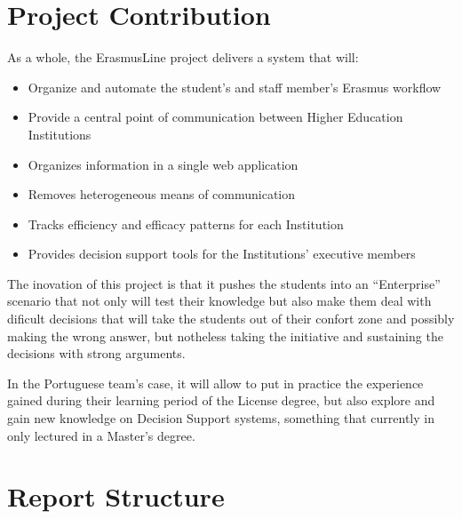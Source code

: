 \newpage

\section{Project Contribution}

As a whole, the ErasmusLine project delivers a system that will:

\begin{itemize}
  \item Organize and automate the student's and staff member's Erasmus workflow
  \item Provide a central point of communication between Higher Education
  Institutions
  \item Organizes information in a single web application
  \item Removes heterogeneous means of communication
  \item Tracks efficiency and efficacy patterns for each Institution
  \item Provides decision support tools for the Institutions' executive members
\end{itemize}

The inovation of this project is that it pushes the students into an
``Enterprise'' scenario that not only will test their knowledge but also make
them deal with dificult decisions that will take the students out of their
confort zone and possibly making the wrong answer, but notheless taking the
initiative and sustaining the decisions with strong arguments.


In the Portuguese team's case, it will allow to put in practice the experience
gained during their learning period of the License degree, but also explore
and gain new knowledge on Decision Support systems, something that
currently in only lectured in a Master's degree.


\section{Report Structure}


